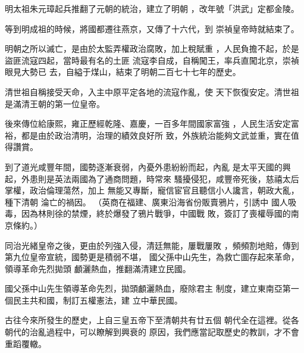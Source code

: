 \documentclass[avery5371,grid]{flashcards}
\begin{document}
{明太祖朱元璋起兵推翻了元朝的統治，建立了明朝
，改年號「洪武」定都金陵。} %
{} %

{等到明成祖的時候，將國都遷往燕京，又傳了十六代，到
崇禎皇帝時就結束了。} %
{} %

{明朝之所以滅亡，是由於太監弄權政治腐敗，加上稅賦重
，人民負擔不起，於是盜匪流寇四起，當時最有名的土匪
流寇李自成，自稱闖王，率兵直闖北京，崇禎眼見大勢已
去，自縊于煤山，結束了明朝二百七十七年的歷史。} %
{} %

{清世祖自稱接受天命，入主中原平定各地的流寇作亂，使
天下恢復安定。清世祖是滿清王朝的第一位皇帝。} %
{} %

{後來傳位給康熙，雍正歷經乾隆、嘉慶，一百多年間國家富強
，人民生活安定富裕，都是由於政治清明，治理的績效良好所
致，外族統治能夠文武並重，實在值得讚賞。} %
{} %

{到了道光咸豐年間，國勢逐漸衰弱，內憂外患紛紛而起，內亂
是太平天國的興起，外患則是英法兩國為了通商問題，時常來
騷擾侵犯，咸豐帝死後，慈禧太后掌權，政治倫理蕩然，加上
無能又專斷，寵信宦官且聽信小人讒言，朝政大亂，種下清朝
淪亡的禍因。} %
{（英商在福建、廣東沿海省份販賣鴉片，引誘中
國人吸毒，因為林則徐的禁煙，終於爆發了鴉片戰爭，中國戰
敗，簽訂了喪權辱國的南京條約。）} %





{同治光緒皇帝之後，更由於列強入侵，清廷無能，屢戰屢敗
，頻頻割地賠，傳到第九位皇帝宣統，國勢更是積弱不堪，
國父孫中山先生，為救亡圖存起來革命，領導革命先烈拋頭
顱灑熱血，推翻滿清建立民國。} %
{} %

{國父孫中山先生領導革命先烈，拋頭顱灑熱血，廢除君主
制度，建立東南亞第一個民主共和國，制訂五權憲法，建
立中華民國。} %
{} %

{古往今來所發生的歷史，上自三皇五帝下至清朝共有廿五個
朝代全在這裡。從各朝代的治亂過程中，可以瞭解到興衰的
原因，我們應當記取歷史的教訓，才不會重蹈覆轍。} %
{} %
\end{document}
